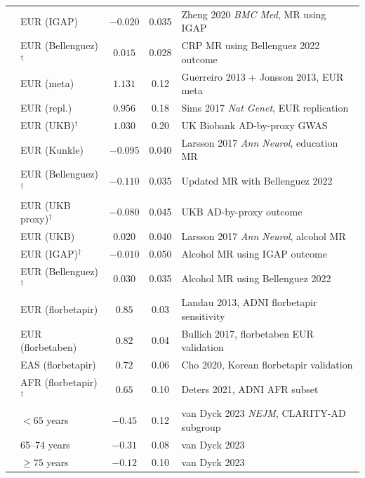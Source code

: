 \documentclass[11pt]{article}
\begin{document}
\begin{table}[h]
\begin{tabular}{@{}llccp{4.5cm}@{}}
& EUR (IGAP) & $-0.020$ & 0.035 & Zheng 2020 \emph{BMC Med}, MR using IGAP \\
& EUR (Bellenguez)$^\dagger$ & $0.015$ & 0.028 & CRP MR using Bellenguez 2022 outcome \\
\midrule
{}
& EUR (meta) & $1.131$ & 0.12 & Guerreiro 2013 + Jonsson 2013, EUR meta \\
& EUR (repl.) & $0.956$ & 0.18 & Sims 2017 \emph{Nat Genet}, EUR replication \\
& EUR (UKB)$^\dagger$ & $1.030$ & 0.20 & UK Biobank AD-by-proxy GWAS \\
\midrule
{}
& EUR (Kunkle) & $-0.095$ & 0.040 & Larsson 2017 \emph{Ann Neurol}, education MR \\
& EUR (Bellenguez)$^\dagger$ & $-0.110$ & 0.035 & Updated MR with Bellenguez 2022 \\
& EUR (UKB proxy)$^\dagger$ & $-0.080$ & 0.045 & UKB AD-by-proxy outcome \\
\midrule
{}
& EUR (UKB) & $0.020$ & 0.040 & Larsson 2017 \emph{Ann Neurol}, alcohol MR \\
& EUR (IGAP)$^\dagger$ & $-0.010$ & 0.050 & Alcohol MR using IGAP outcome \\
& EUR (Bellenguez)$^\dagger$ & $0.030$ & 0.035 & Alcohol MR using Bellenguez 2022 \\
\midrule
{}
& EUR (florbetapir) & $0.85$ & 0.03 & Landau 2013, ADNI florbetapir sensitivity \\
& EUR (florbetaben) & $0.82$ & 0.04 & Bullich 2017, florbetaben EUR validation \\
& EAS (florbetapir) & $0.72$ & 0.06 & Cho 2020, Korean florbetapir validation \\
& AFR (florbetapir)$^\dagger$ & $0.65$ & 0.10 & Deters 2021, ADNI AFR subset \\
\midrule
{}
& $< 65$ years & $-0.45$ & 0.12 & van Dyck 2023 \emph{NEJM}, CLARITY-AD subgroup \\
& 65--74 years & $-0.31$ & 0.08 & van Dyck 2023 \\
& $\geq 75$ years & $-0.12$ & 0.10 & van Dyck 2023 \\

\end{tabular}
\end{table}
\end{document}
